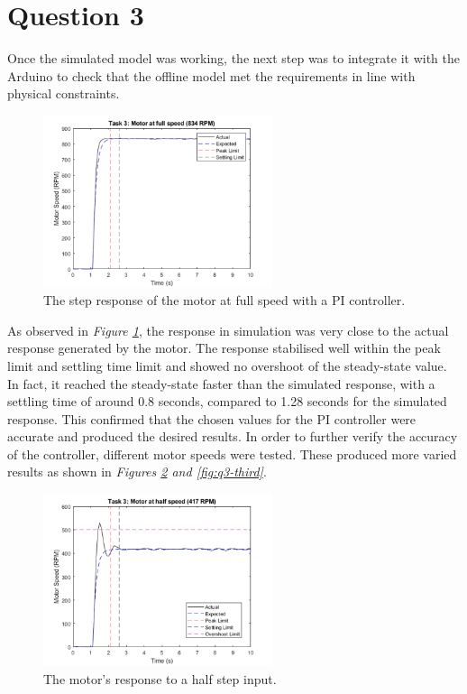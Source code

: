 \documentclass[11pt, onecolumn]{article}
\begin{document}
\section*{Question 3}
\par Once the simulated model was working, the next step was to integrate it with the Arduino to check that the offline model met the requirements in line with physical constraints.
\begin{figure}[h!]
    \centering
    \includegraphics[width=0.6\textwidth]{q3-g1.png}
    \caption{The step response of the motor at full speed with a PI controller.}
    \label{fig:q3-first}
\end{figure}
\par As observed in \textit{Figure \ref{fig:q3-first}}, the response in simulation was very close to the actual response generated by the motor. The response stabilised well within the peak limit and settling time limit and showed no overshoot of the steady-state value. In fact, it reached the steady-state faster than the simulated response, with a settling time of around 0.8 seconds, compared to 1.28 seconds for the simulated response. This confirmed that the chosen values for the PI controller were accurate and produced the desired results. In order to further verify the accuracy of the controller, different motor speeds were tested. These produced more varied results as shown in \textit{Figures \ref{fig:q3-second} and \ref{fig:q3-third}}.
\begin{figure}[h!]
    \centering
    \includegraphics[width=0.6\textwidth]{q3-g2.png}
    \caption{The motor's response to a half step input.}
    \label{fig:q3-second}
\end{figure}
\end{document}
